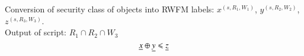 \begin{enumerate}
{    	Conversion of security class of objects into RWFM labels: $x^{(s,R_1,W_1)}$, $y^{(s,R_2,W_2)}$, $z^{(s,R_3,W_3)}$.\\
    	Output of script: $R_1 \cap R_2 \cap W_3$
    	 \begin{equation}\label{eqn:cons}
    	 \underline{x} \oplus \underline{y} \leqslant \underline{z}
    	 \end{equation}
    	       
    }	
\end{enumerate}

